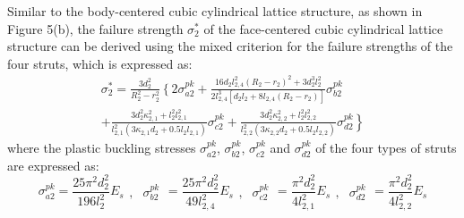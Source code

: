\documentclass{article} %
\begin{document}
Similar to the body-centered cubic cylindrical lattice structure, as shown in Figure 5(b), the failure strength $\sigma _{2}^{*} $ of the face-centered cubic cylindrical lattice structure can be derived using the mixed criterion for the failure strengths of the four struts, which is expressed as:
\begin{equation} \label{GrindEQ__27_} 
\begin{array}{l} {\sigma _{2}^{*} =\frac{3d_{2}^{2} }{R_{2}^{2} -r_{2}^{2} } \left\{2\right. \sigma _{a2}^{pk} +\frac{16d_{2} l_{2,4}^{2} \left(R_{2} -r_{2} \right)^{2} +3d_{2}^{3} l_{2}^{2} }{2l_{2,4}^{3} \left[d_{2} l_{2} +8l_{2,4} \left(R_{2} -r_{2} \right)\right]} \sigma _{b2}^{pk} } \\ {+\frac{3d_{2}^{2} \kappa _{2,1}^{2} +l_{2}^{2} l_{2,1}^{2} }{l_{2,1}^{2} \left(3\kappa _{2,1} d_{2} +0.5l_{2} l_{2,1} \right)} \sigma _{c2}^{pk} +\frac{3d_{2}^{2} \kappa _{2,2}^{2} +l_{2}^{2} l_{2,2}^{2} }{l_{2,2}^{2} \left(3\kappa _{2,2} d_{2} +0.5l_{2} l_{2,2} \right)} \left. \sigma _{d2}^{pk} \right\}} \end{array} 
\end{equation} 
where the plastic buckling stresses $\sigma _{a2}^{pk} $, $\sigma _{b2}^{pk} $, $\sigma _{c2}^{pk} $ and $\sigma _{d2}^{pk} $ of the four types of struts are expressed as:
\[\sigma _{a2}^{pk} =\frac{25\pi ^{2} d_{2}^{2} }{196l_{2}^{2} } E_{s} \begin{array}{cc} {,} & {\sigma _{b2}^{pk} } \end{array}=\frac{25\pi ^{2} d_{2}^{2} }{49l_{2,4}^{2} } E_{s} \begin{array}{cc} {,} & {\sigma _{c2}^{pk} } \end{array}=\frac{\pi ^{2} d_{2}^{2} }{4l_{2,1}^{2} } E_{s} \begin{array}{cc} {,} & {\sigma _{d2}^{pk} } \end{array}=\frac{\pi ^{2} d_{2}^{2} }{4l_{2,2}^{2} } E_{s} \] 
\end{document}
